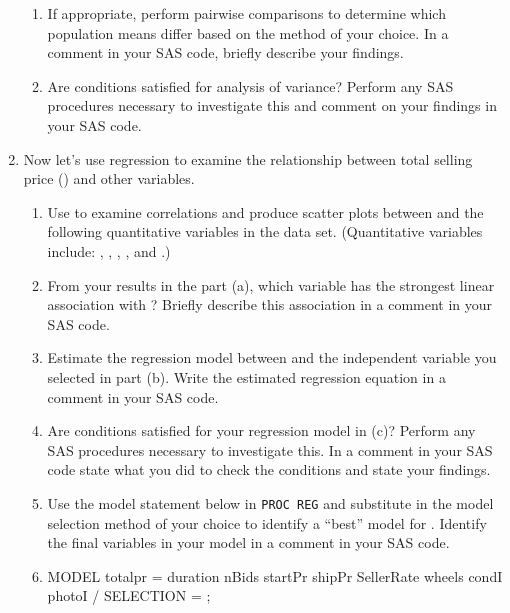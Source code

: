 \begin{enumerate}
\begin{enumerate}
\item
If appropriate, perform pairwise comparisons to determine which population means differ based on the method of your choice.  In a comment in your SAS code, briefly describe your findings.
\item
Are conditions satisfied for analysis of variance?  Perform any SAS procedures necessary to investigate this and comment on your findings in your SAS code.
\end{enumerate}
\item Now let's use regression to examine the relationship between total selling price () and other variables.
\begin{enumerate}
    \item Use  to examine correlations and produce scatter plots between  and the following quantitative variables in the data set. (Quantitative variables include:  , , , , and .)
    \item From your results in the part (a), which variable has the strongest linear association with ?  Briefly describe this association in a comment in your SAS code.
    \item Estimate the regression model between  and the independent variable you selected in part (b).  Write the estimated regression equation in a comment in your SAS code.
    \item Are conditions satisfied for your regression model in (c)?  Perform any SAS procedures necessary to investigate this.  In a comment in your SAS code state what you did to check the conditions and state your findings.
    \item Use the model statement below in \texttt{PROC REG} and substitute in the model selection method of your choice to identify a ``best'' model for .  Identify the final variables in your model in a comment in your SAS code.
    \item[]
    \begin{code}{.0}
    MODEL totalpr = duration nBids startPr shipPr
                    SellerRate wheels condI photoI
                    / SELECTION =   ;
    \end{code}
\end{enumerate}


\end{enumerate}
 